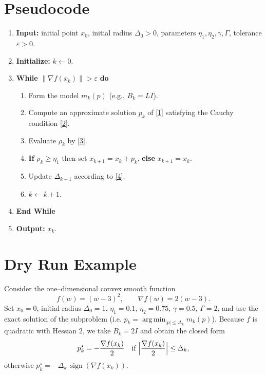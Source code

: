 \documentclass{article}
\newcommand{\norm}[1]{\left\lVert#1\right\rVert}
\begin{document}
\section*{Pseudocode}
\begin{enumerate}[label=Step \arabic*:, leftmargin=*, itemsep=2pt]
\item \textbf{Input:} initial point $x_{0}$, initial radius $\Delta_{0}>0$, parameters
$\eta_{1},\eta_{2},\gamma,\Gamma$, tolerance $\varepsilon>0$.
\item \textbf{Initialize:} $k\leftarrow0$.
\item \textbf{While} $\norm{\nabla f(x_k)}> \varepsilon$ \textbf{do}
\begin{enumerate}[label=\arabic*.]
\item Form the model $m_k(p)$ (e.g., $B_k=L I$).
\item Compute an approximate solution $p_k$ of \eqref{1} satisfying
the Cauchy condition \eqref{2}.
\item Evaluate $\rho_k$ by \eqref{3}.
\item \textbf{If} $\rho_k\ge \eta_{1}$ then set $x_{k+1}=x_k+p_k$,
\textbf{else} $x_{k+1}=x_k$.
\item Update $\Delta_{k+1}$ according to \eqref{4}.
\item $k\leftarrow k+1$.
\end{enumerate}
\item \textbf{End While}
\item \textbf{Output:} $x_k$.
\end{enumerate}

\section*{Dry Run Example}
Consider the one–dimensional convex smooth function
\[
f(w)=(w-3)^{2},\qquad \nabla f(w)=2(w-3).
\]
Set $x_{0}=0$, initial radius $\Delta_{0}=1$, $\eta_{1}=0.1$, $\eta_{2}=0.75$,
$\gamma=0.5$, $\Gamma=2$, and use the exact solution of the subproblem
(i.e. $p_k = \operatorname*{arg\,min}_{|p|\le\Delta_k} m_k(p)$).  
Because $f$ is quadratic with Hessian $2$, we take $B_k=2I$ and obtain the closed form
\[
p_k^{\star}= -\frac{\nabla f(x_k)}{2}\quad\text{if } \Bigl|\frac{\nabla f(x_k)}{2}\Bigr|\le\Delta_k,
\]
otherwise $p_k^{\star}= -\Delta_k\,\operatorname{sign}(\nabla f(x_k))$.
\end{document}
